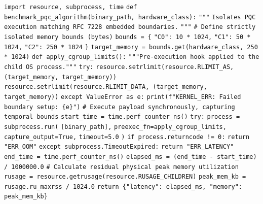\begin{algorithm*}[htbp]
\caption{Deterministic C-Group Based Memory/Time Isolation Mapping (Python 3)}\label{alg:cgroup_sim}
\begin{algorithmic}[1]
\State \texttt{import resource, subprocess, time}
\State
\State \texttt{def benchmark\_pqc\_algorithm(binary\_path, hardware\_class):}
\State \indent \texttt{"""}
\State \indent \texttt{Isolates PQC execution matching RFC 7228 embedded boundaries.}
\State \indent \texttt{"""}
\State \indent \texttt{\# Define strictly isolated memory bounds (bytes)}
\State \indent \texttt{bounds = \{}
\State \indent \indent \texttt{"C0": 10 * 1024,} 
\State \indent \indent \texttt{"C1": 50 * 1024,} 
\State \indent \indent \texttt{"C2": 250 * 1024} 
\State \indent \texttt{\}}
\State
\State \indent \texttt{target\_memory = bounds.get(hardware\_class, 250 * 1024)}
\State
\State \indent \texttt{def apply\_cgroup\_limits():}
\State \indent \indent \texttt{"""Pre-execution hook applied to the child OS process."""}
\State \indent \indent \texttt{try:}
\State \indent \indent \indent \texttt{resource.setrlimit(resource.RLIMIT\_AS, (target\_memory, target\_memory))}
\State \indent \indent \indent \texttt{resource.setrlimit(resource.RLIMIT\_DATA, (target\_memory, target\_memory))}
\State \indent \indent \texttt{except ValueError as e:}
\State \indent \indent \indent \texttt{print(f"KERNEL\_ERR: Failed boundary setup: \{e\}")}
\State
\State \indent \texttt{\# Execute payload synchronously, capturing temporal bounds}
\State \indent \texttt{start\_time = time.perf\_counter\_ns()}
\State \indent \texttt{try:}
\State \indent \indent \texttt{process = subprocess.run(}
\State \indent \indent \indent \texttt{[binary\_path],}
\State \indent \indent \indent \texttt{preexec\_fn=apply\_cgroup\_limits,}
\State \indent \indent \indent \texttt{capture\_output=True,}
\State \indent \indent \indent \texttt{timeout=5.0} 
\State \indent \indent \texttt{)}
\State \indent \indent \texttt{if process.returncode != 0:}
\State \indent \indent \indent \texttt{return "ERR\_OOM"} 
\State \indent \texttt{except subprocess.TimeoutExpired:}
\State \indent \indent \texttt{return "ERR\_LATENCY"}
\State
\State \indent \texttt{end\_time = time.perf\_counter\_ns()}
\State \indent \texttt{elapsed\_ms = (end\_time - start\_time) / 1000000.0}
\State
\State \indent \texttt{\# Calculate residual physical peak memory utilization}
\State \indent \texttt{rusage = resource.getrusage(resource.RUSAGE\_CHILDREN)}
\State \indent \texttt{peak\_mem\_kb = rusage.ru\_maxrss / 1024.0}
\State
\State \indent \texttt{return \{"latency": elapsed\_ms, "memory": peak\_mem\_kb\}}
\end{algorithmic}
\end{algorithm*}

